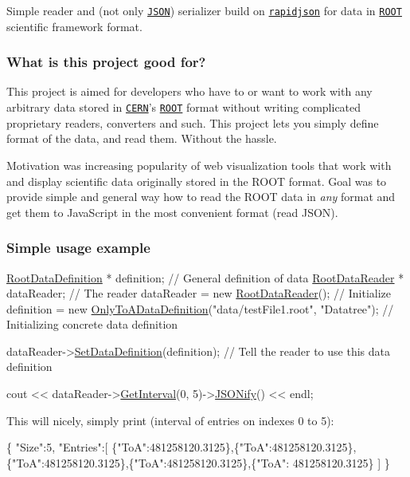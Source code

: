 Simple reader and (not only \href{http://json.org/}{\tt J\+S\+O\+N}) serializer build on \href{https://github.com/miloyip/rapidjson}{\tt rapidjson} for data in \href{https://root.cern.ch/}{\tt R\+O\+O\+T} scientific framework format.

\subsubsection*{What is this project good for?}

This project is aimed for developers who have to or want to work with any arbitrary data stored in \href{http://home.cern/}{\tt C\+E\+R\+N}'s \href{https://root.cern.ch/}{\tt R\+O\+O\+T} format without writing complicated proprietary readers, converters and such. This project lets you simply define format of the data, and read them. Without the hassle.

Motivation was increasing popularity of web visualization tools that work with and display scientific data originally stored in the R\+O\+O\+T format. Goal was to provide simple and general way how to read the R\+O\+O\+T data in {\itshape any} format and get them to Java\+Script in the most convenient format (read J\+S\+O\+N).

\subsubsection*{Simple usage example}


\begin{DoxyCode}
\hyperlink{classRootDataDefinition}{RootDataDefinition} * definition;        \textcolor{comment}{// General definition of data }
\hyperlink{classRootDataReader}{RootDataReader} * dataReader;            \textcolor{comment}{// The reader}
dataReader = \textcolor{keyword}{new} \hyperlink{classRootDataReader}{RootDataReader}();      \textcolor{comment}{// Initialize}
definition = \textcolor{keyword}{new} \hyperlink{classOnlyToADataDefinition}{OnlyToADataDefinition}(\textcolor{stringliteral}{"data/testFile1.root"}, \textcolor{stringliteral}{"Datatree"});  \textcolor{comment}{//
       Initializing concrete data definition}

dataReader->\hyperlink{classRootDataReader_ad670745df69f90ea6578d7c29cab716f}{SetDataDefinition}(definition);  \textcolor{comment}{// Tell the reader to use this data definition}

cout << dataReader->\hyperlink{classRootDataReader_a76a02dd2cc6f4cde896ce9180048671b}{GetInterval}(0, 5)->\hyperlink{classDataEntryInterval_ad27bffbb603c300714090c809ee58570}{JSONify}() << endl;
\end{DoxyCode}
 This will nicely, simply print (interval of entries on indexes 0 to 5)\+: 
\begin{DoxyCode}
\{
  \textcolor{stringliteral}{"Size"}:5,
  \textcolor{stringliteral}{"Entries"}:[
    \{\textcolor{stringliteral}{"ToA"}:481258120.3125\},\{\textcolor{stringliteral}{"ToA"}:481258120.3125\},\{\textcolor{stringliteral}{"ToA"}:481258120.3125\},\{\textcolor{stringliteral}{"ToA"}:481258120.3125\},\{\textcolor{stringliteral}{"ToA"}:
      481258120.3125\}
  ]
\}
\end{DoxyCode}
